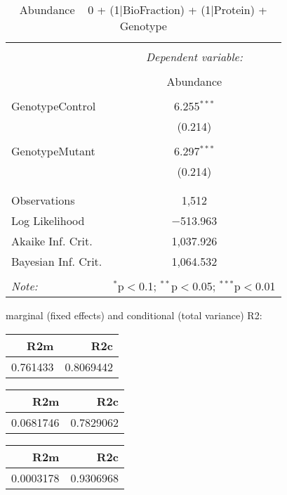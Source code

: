 \documentclass[11pt]{report}
\begin{document}
\begin{table}[!htbp] \centering 
  \caption{Abundance ~ 0 + (1|BioFraction) + (1|Protein) + Genotype} 
  \label{} 
\begin{tabular}{@{\extracolsep{5pt}}lc} 
\\[-1.8ex]\hline 
\hline \\[-1.8ex] 
 & \multicolumn{1}{c}{\textit{Dependent variable:}} \\ 
\cline{2-2} 
\\[-1.8ex] & Abundance \\ 
\hline \\[-1.8ex] 
 GenotypeControl & 6.255$^{***}$ \\ 
  & (0.214) \\ 
  & \\ 
 GenotypeMutant & 6.297$^{***}$ \\ 
  & (0.214) \\ 
  & \\ 
\hline \\[-1.8ex] 
Observations & 1,512 \\ 
Log Likelihood & $-$513.963 \\ 
Akaike Inf. Crit. & 1,037.926 \\ 
Bayesian Inf. Crit. & 1,064.532 \\ 
\hline 
\hline \\[-1.8ex] 
\textit{Note:}  & \multicolumn{1}{r}{$^{*}$p$<$0.1; $^{**}$p$<$0.05; $^{***}$p$<$0.01} \\ 
\end{tabular} 
\end{table} 
marginal (fixed effects) and conditional (total variance) R2:

\begin{tabular}{r|r}
\hline
R2m & R2c\\
\hline
0.761433 & 0.8069442\\
\hline
\end{tabular}

\begin{tabular}{r|r}
\hline
R2m & R2c\\
\hline
0.0681746 & 0.7829062\\
\hline
\end{tabular}

\begin{tabular}{r|r}
\hline
R2m & R2c\\
\hline
0.0003178 & 0.9306968\\
\hline
\end{tabular}
\end{document}
